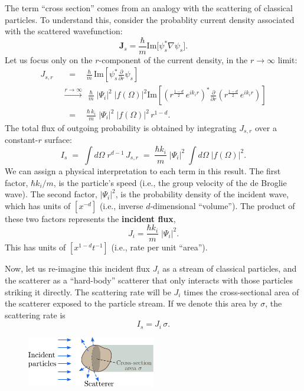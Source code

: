 \documentclass[pra,12pt]{revtex4}
\begin{document}
The term ``cross section'' comes from an analogy with the scattering
of classical particles.  To understand this, consider the probablity
current density associated with the scattered wavefunction:
$$\mathbf{J}_s = \frac{\hbar}{m} \mathrm{Im}\big[\psi_s^*\nabla\psi_s\big].$$
Let us focus only on the $r$-component of the current density, in the
$r\rightarrow\infty$ limit:
$$\begin{aligned}J_{s,r}\; &\;\;=\;\;\;\, \frac{\hbar}{m}\, \mathrm{Im}\left[\psi_s^* \frac{\partial}{\partial r}\psi_s\right] \\ &\overset{r\rightarrow\infty}{\longrightarrow}\;\, \frac{\hbar}{m}\; |\Psi_i|^2 \; |f(\Omega)|^2 \mathrm{Im}\left[\left(r^{\frac{1-d}{2}} \, e^{ik_ir}\right)^* \frac{\partial}{\partial r} \left(r^{\frac{1-d}{2}} \, e^{ik_ir}\right)\right] \\ & \;\;=\;\;\;\, \frac{\hbar \,k_i}{m}\; |\Psi_i|^2 \; |f(\Omega)|^2 \,r^{1-d}.\end{aligned}$$
The total flux of outgoing probability is obtained by integrating
$J_{s,r}$ over a constant-$r$ surface:
$$I_s \;=\; \int d\Omega\; r^{d-1} \, J_{s,r} \;=\; \frac{\hbar k_i}{m} \;|\Psi_i|^2 \; \int d\Omega\; \big|f(\Omega)\big|^2.$$
We can assign a physical interpretation to each term in this
result.  The first factor, $\hbar k_i/m$, is the
particle's speed (i.e., the group velocity of the de Broglie wave).
The second factor, $|\Psi_i|^2$, is the probability density of the incident
wave, which has units of $[x^{-d}]$ (i.e., inverse $d$-dimensional
``volume'').  The product of these two factors represents the
\textbf{incident flux},
$$J_{i} = \frac{\hbar k_i}{m} \;|\Psi_i|^2.$$
This has units of $[x^{1-d}t^{-1}]$ (i.e., rate per unit ``area'').

Now, let us re-imagine this incident flux $J_i$ as a stream of
classical particles, and the scatterer as a ``hard-body'' scatterer
that only interacts with those particles striking it directly.  The
scattering rate will be $J_{i}$ times the cross-sectional area of the
scatterer exposed to the particle stream.  If we denote this area by
$\sigma$, the scattering rate is
$$I_s = J_i \, \sigma.$$

\begin{figure}[h]
  \centering\includegraphics[width=0.5\textwidth]{crosssection}
\end{figure}
\end{document}

